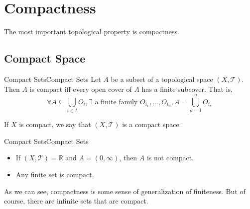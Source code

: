 \documentclass[../main.tex]{subfiles}
\begin{document}
\chapter{Compactness}

The most important topological property is compactness.

\section{Compact Space}
\begin{definition}{Compact Sets}{Compact Sets}
Let $A$ be a subset of a topological space $(X,\mathcal{T})$. Then $A$ is compact iff every open cover of $A$ has a finite subcover. That is,
\begin{equation*}
\forall A \subseteq \bigcup_{i\in I} O_i, \exists \text{ a finite family } O_{i_1}, \ldots ,O_{i_n}, A = \bigcup_{k=1}^{n} O_{i_k} 
\end{equation*}

If $X$ is compact, we say that $(X,\mathcal{T})$ is a compact space.
\end{definition}

\begin{example}{Compact Sets}{Compact Sets}
\begin{itemize}
\item If $(X,\mathcal{T}) = \mathbb{R}$ and $A = (0,\infty )$, then $A$ is not compact.
\item Any finite set is compact.
\end{itemize}
\end{example}

\begin{remark}
As we can see, compactness is some sense of generalization of finiteness. But of course, there are infinite sets that are compact.
\end{remark}
\end{document}

